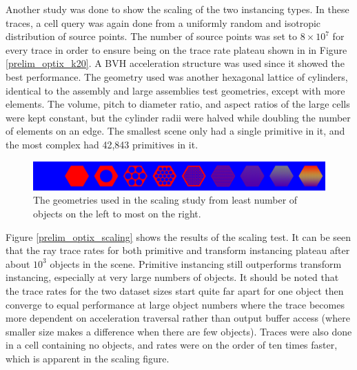 Another study was done to show the scaling of the two instancing types.  In these traces, a cell query was again done from a uniformly random and isotropic distribution of source points.  The number of source points was set to $8\times10^7$ for every trace in order to ensure being on the trace rate plateau shown in in Figure \ref{prelim_optix_k20}.  A BVH acceleration structure was used since it showed the best performance.  The geometry used was another hexagonal lattice of cylinders, identical to the assembly and large assemblies test geometries, except with more elements.  The volume, pitch to diameter ratio, and aspect ratios of the large cells were kept constant, but the cylinder radii were halved while doubling the number of elements on an edge.  The smallest scene only had a single primitive in it, and the most complex had 42,843 primitives in it.  

\begin{figure}[h!] 
  \centering
    \includegraphics[width=1.0\textwidth]{graphics/prelim/prelim_scaling_geom.png}
     \caption{The geometries used in the scaling study from least number of objects on the left to most on the right. \label{prelim_scaling_geom} }
\end{figure}

Figure \ref{prelim_optix_scaling} shows the results of the scaling test. It can be seen that the ray trace rates for both primitive and transform instancing plateau after about $10^3$ objects in the scene. %
 Primitive instancing still outperforms transform instancing, especially at very large numbers of objects.%
   It should be noted that the trace rates for the two dataset sizes start quite far apart for one object then converge to equal performance at large object numbers where the trace becomes more dependent on acceleration traversal rather than output buffer access (where smaller size makes a difference when there are few objects). %
  Traces were also done in a cell containing no objects, and rates were on the order of ten times faster, which is apparent in the scaling figure.%


